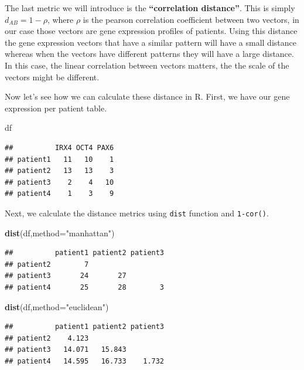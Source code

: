 \documentclass[12pt,]{krantz}
\newenvironment{Shaded}{\begin{snugshade}}{\end{snugshade}}
\newcommand{\DataTypeTok}[1]{\textcolor[rgb]{0.13,0.29,0.53}{#1}}
\newcommand{\KeywordTok}[1]{\textcolor[rgb]{0.13,0.29,0.53}{\textbf{#1}}}
\newcommand{\NormalTok}[1]{#1}
\newcommand{\StringTok}[1]{\textcolor[rgb]{0.31,0.60,0.02}{#1}}
\theoremstyle{definition}
\theoremstyle{definition}
\theoremstyle{definition}
\theoremstyle{remark}
\begin{document}
The last metric we will introduce is the \textbf{``correlation
distance''}. This is simply \(d_{AB}=1-\rho\), where \(\rho\) is the
pearson correlation coefficient between two vectors, in our case those
vectors are gene expression profiles of patients. Using this distance
the gene expression vectors that have a similar pattern will have a
small distance whereas when the vectors have different patterns they
will have a large distance. In this case, the linear correlation between
vectors matters, the the scale of the vectors might be different.

Now let's see how we can calculate these distance in R. First, we have
our gene expression per patient table.

\begin{Shaded}
\begin{Highlighting}[]
\NormalTok{df}
\end{Highlighting}
\end{Shaded}

\begin{verbatim}
##          IRX4 OCT4 PAX6
## patient1   11   10    1
## patient2   13   13    3
## patient3    2    4   10
## patient4    1    3    9
\end{verbatim}

Next, we calculate the distance metrics using \texttt{dist} function and
\texttt{1-cor()}.

\begin{Shaded}
\begin{Highlighting}[]
\KeywordTok{dist}\NormalTok{(df,}\DataTypeTok{method=}\StringTok{"manhattan"}\NormalTok{)}
\end{Highlighting}
\end{Shaded}

\begin{verbatim}
##          patient1 patient2 patient3
## patient2        7                  
## patient3       24       27         
## patient4       25       28        3
\end{verbatim}

\begin{Shaded}
\begin{Highlighting}[]
\KeywordTok{dist}\NormalTok{(df,}\DataTypeTok{method=}\StringTok{"euclidean"}\NormalTok{)}
\end{Highlighting}
\end{Shaded}

\begin{verbatim}
##          patient1 patient2 patient3
## patient2    4.123                  
## patient3   14.071   15.843         
## patient4   14.595   16.733    1.732
\end{verbatim}
\end{document}
